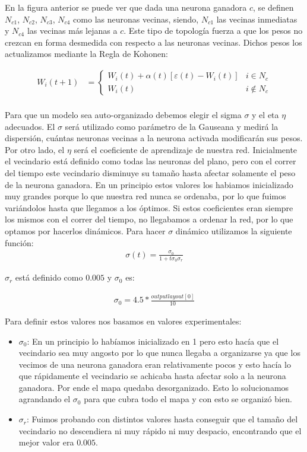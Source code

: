 En la figura anterior se puede ver que dada una neurona ganadora $c$, se definen $N_{c1}$, $N_{c2}$, $N_{c3}$, $N_{c4}$ como las neuronas vecinas, siendo, $N_{c1}$ las vecinas inmediatas y $N_{c4}$ las vecinas más lejanas a $c$. Este tipo de topología fuerza a que los pesos no crezcan en forma desmedida con respecto a las neuronas vecinas. Dichos pesos los actualizamos mediante la Regla de Kohonen:

\begin{align*}
	W_{i}(t+1) &=  \begin{cases}
						W_{i}(t) + \alpha(t) [ \varepsilon(t) - W_{i}(t) ] & i \in N_{c} \\
						W_{i}(t)                                           & i \not \in N_{c}  
					\end{cases} \\
\end{align*}

Para que un modelo sea auto-organizado debemos elegir el sigma $\sigma$ y  el eta $\eta$ adecuados. El $\sigma$ será utilizado como parámetro de la Gauseana y medirá la dispersión, cuántas neuronas vecinas a la neurona activada modificarán sus pesos. Por otro lado, el $\eta$ será el coeficiente de aprendizaje de nuestra red. 
Inicialmente el vecindario está definido como todas las neuronas del plano, pero con el correr del tiempo 
este vecindario disminuye su tamaño hasta afectar solamente el peso de la neurona ganadora. En un principio estos valores los habiamos inicializado muy grandes porque lo que nuestra red nunca se ordenaba, por lo que  fuimos variándolos hasta que llegamos a los óptimos. Si estos coeficientes eran siempre los mismos con el correr del tiempo, no llegabamos a ordenar la red, por lo que optamos por hacerlos dinámicos. 
Para hacer $\sigma$ dinámico utilizamos la siguiente función:
\begin{align*}
		\sigma(t) = \frac{\sigma_{0}}{1 + t \sigma_{0} \sigma_{r}} 
\end{align*}

$\sigma_{r}$ está definido como $0.005$ y $\sigma_{0}$ es:

\begin{align*}
		\sigma_{0} = 4.5 * \frac{outputlayout[0]}{10} 
\end{align*}

Para definir estos valores nos basamos en valores experimentales:

\begin{itemize}
	\item $\sigma_{0}$: En un principio lo habíamos inicializado en 1 pero esto hacía que el vecindario sea muy angosto por lo que nunca llegaba a organizarse ya que los vecimos de una neurona ganadora eran relativamente pocos y esto hacía lo que rápidamente el vecindario se achicaba hasta afectar solo a la neurona ganadora. Por ende el mapa quedaba desorganizado. Esto lo solucionamos agrandando el $\sigma_{0}$ para que cubra todo el mapa y con esto se organizó bien.
	\item $\sigma_{r}$: Fuimos probando con distintos valores hasta conseguir que el tamaño del vecindario no descendiera ni muy rápido ni muy despacio, encontrando que el mejor valor era $0.005$. 
\end{itemize}	

